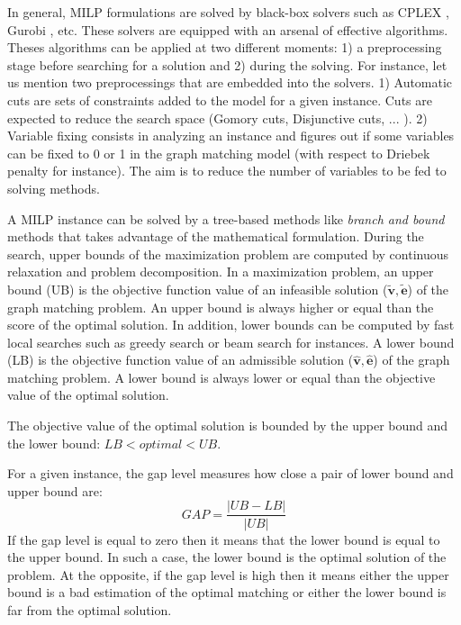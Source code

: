 \documentclass[times,onecolumn,final,authoryear]{article}
\theoremstyle{definition}
\begin{document}

In general, MILP formulations are solved by black-box solvers such as CPLEX \cite{cplex2009v12}, Gurobi \cite{gurobi}, etc. These solvers are equipped with an arsenal of effective algorithms. Theses algorithms can be applied at two different moments: 1) a preprocessing stage before searching for a solution and 2) during the solving.
For instance, let us mention two preprocessings that are embedded into the solvers. 1) Automatic cuts are sets of constraints added to the model for a given instance. Cuts are expected to reduce the search space (Gomory cuts, Disjunctive cuts, ... ). 2) Variable fixing consists in analyzing an instance and figures out if some variables can be fixed to 0 or 1 in the graph matching model (with respect to Driebek penalty for instance). The aim is to reduce the number of variables to be fed to solving methods.

A MILP instance can be solved by a tree-based methods like \textit{branch and bound} methods that takes advantage of the mathematical formulation. During the search, upper bounds of the maximization problem are computed by continuous relaxation and problem decomposition. In a maximization problem, an upper bound (UB) is the objective function value of an infeasible solution ($\tilde{\mathbf{v}},\tilde{\mathbf{e}}$) of the graph matching problem. An upper bound is always higher or equal than the score of the optimal solution.
In addition, lower bounds can be computed by fast local searches such as greedy search or beam search for instances. A lower bound (LB) is the objective function value of
an admissible solution ($\hat{\mathbf{v}},\hat{\mathbf{e}}$) of the graph matching problem. A lower bound is always lower or equal than the objective value of the optimal solution.

The objective value of the optimal solution is bounded by the upper bound and the lower bound: $LB<optimal<UB$.


For a given instance, the gap level measures how close a pair of lower bound and upper bound are:
\begin{equation}
    \label{gap}
    GAP= \frac{|UB-LB|}{|UB|}
\end{equation}
If the gap level is equal to zero then it means that the lower bound is equal to the upper bound. In such a case, the lower bound is the optimal solution of the problem. At the opposite, if the gap level is high then it means either the upper bound is a bad estimation of the optimal matching or either the lower bound is far from the optimal solution.
\end{document}
